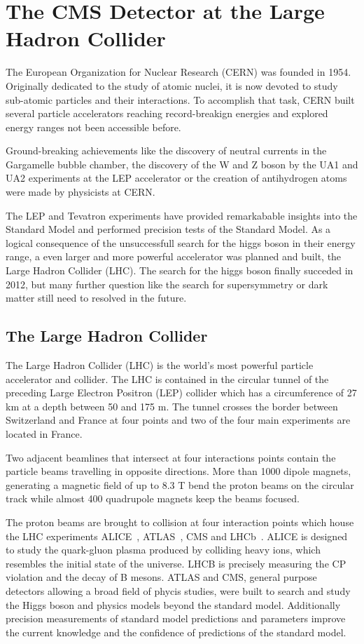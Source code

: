 
\chapter{The CMS Detector at the Large Hadron Collider}

The European Organization for Nuclear Research (CERN) was founded in 1954.
Originally dedicated to the study of atomic nuclei, it is now devoted to
study sub-atomic particles and their interactions. To accomplish that task, CERN
built several particle accelerators reaching record-breakign energies and
explored energy ranges not been accessible before.

Ground-breaking achievements like the discovery of neutral currents in the
Gargamelle bubble chamber, the discovery of the W and Z boson by the UA1 and UA2
experiments at the LEP accelerator or the creation of antihydrogen atoms were
made by physicists at CERN.

The LEP and Tevatron experiments have provided remarkabable insights into the
Standard Model and performed precision tests of the Standard Model. As a logical
consequence of the unsuccessfull search for the higgs boson in their energy
range, a even larger and more powerful accelerator was planned and built, the
Large Hadron Collider (LHC). The search for the higgs boson finally succeded in
2012, but many further question like the search for supersymmetry or dark matter
still need to resolved in the future.

\section{The Large Hadron Collider}

The Large Hadron Collider (LHC) is the world's most powerful particle
accelerator and collider. The LHC is contained in the circular tunnel of the
preceding Large Electron Positron (LEP) collider which has a circumference of 27
km at a depth between 50 and 175 m. The tunnel crosses the border between
Switzerland and France at four points and two of the four main experiments are
located in France. 

Two adjacent beamlines that intersect at four interactions points contain the
particle beams travelling in opposite directions. More than 1000 dipole magnets,
generating a magnetic field of up to 8.3 T bend the proton beams on the circular track while
almost 400 quadrupole magnets keep the beams focused. 

The proton beams are brought to collision at four interaction points which house
the LHC experiments ALICE~\cite{ALICE}, ATLAS~\cite{ATLASa}, CMS and
LHCb~\cite{LHCb}. ALICE is designed to study the quark-gluon plasma produced by
colliding heavy ions, which resembles the initial state of the universe. LHCB is
precisely measuring the CP violation and the decay of B mesons. ATLAS and CMS,
general purpose detectors allowing a broad field of phycis studies, were built
to search and study the Higgs boson and physics models beyond the standard
model. Additionally precision measurements of standard model predictions and
parameters improve the current knowledge and the confidence of predictions of
the standard model.

